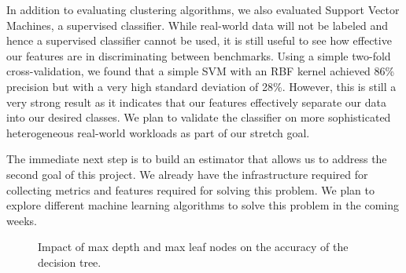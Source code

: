 In addition to evaluating clustering algorithms, we also evaluated
Support Vector Machines, a supervised classifier. While real-world
data will not be labeled and hence a supervised classifier cannot be
used, it is still useful to see how effective our features are in
discriminating between benchmarks. Using a simple two-fold
cross-validation, we found that a simple SVM with an RBF kernel
achieved 86\% precision but with a very high standard deviation of
28\%. However, this is still a very strong result as it indicates that
our features effectively separate our data into our desired
classes. 
We plan to validate the classifier on more sophisticated heterogeneous 
real-world workloads as part of our stretch goal.

The immediate next step is to build an estimator that allows us to address the
second goal of this project. We already have the infrastructure required
for collecting metrics and features required for solving this problem.
We plan to explore different machine learning algorithms to solve this
problem in the coming weeks.

\begin{figure}[h!]
    \centering
	\caption{Impact of max depth and max leaf nodes on the accuracy of the
    decision tree.}
\end{figure}

